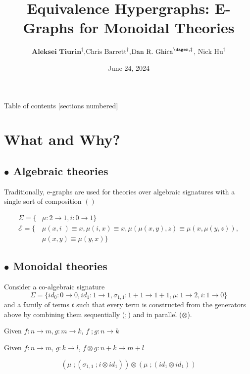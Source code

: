 \documentclass[aspectratio=169]{beamer}
\title{Equivalence Hypergraphs: E-Graphs for Monoidal Theories}
\date{June 24, 2024} %
\author[Aleksei Tiurin]{$\textbf{Aleksei Tiurin}^{\dagger}$,$\text{Chris Barrett}^{\dagger}$,$\text{Dan R. Ghica}^{\dager,\ddagger}$, $\text{Nick Hu}^{\dagger}$}
\institute{$^{\dagger}$University of Birmingham, $^{\dagger}$ Huawei Central Software Institute}
\newcommand{\bsubsection}[1]{\subsection{$\bullet$ #1}}
\begin{document}
 

\maketitle 

\begin{frame}{Table of contents}
    \small
    [sections numbered]
    \tableofcontents
\end{frame}

\section{What and Why?}
\bsubsection{Algebraic theories}

\begin{frame}
    Traditionally, e-graphs are used for \alert{theories} over \alert{algebraic} signatures with a single sort of composition $()$
    \pause
    \vfill
    \begin{example}
    
    \begin{align*}
    \Sigma = \{&\mu : 2 \to 1, i : 0 \to 1\}\\
    \mathcal{E} = \{&\mu(x,i\;) \equiv x, \mu(i,x) \equiv x,
     \mu(\mu(x,y),z) \equiv \mu(x,\mu(y,z)),\\
    &\mu(x,y) \equiv \mu(y,x)\}    
    \end{align*}
    \end{example}

\end{frame}

\bsubsection{Monoidal theories}

\begin{frame}{}
    
Consider a \alert{co-algebraic} signature 
\[
\Sigma = \{id_0 : 0 \to 0, id_{1} : 1 \to 1, \sigma_{1,1} : 1 + 1 \to 1 + 1,\mu : 1 \to 2, i : 1 \to 0\}
\]
and a family of terms $t$ such that every term is constructed from the generators above by combining them sequentially ($;$) and in parallel ($\otimes$).

Given $f : n \to m, g : m \to k$, $f\;;g : n \to k$

Given $f : n \to m$, $g : k \to l$, $f \otimes g : n + k \to m + l$

\pause
\begin{example}
    \[
    (\mu\;;(\sigma_{1,1}\;;i \otimes id_{1})) \otimes (\mu\;;(id_{1}\otimes id_{1}))
    \]
\end{example}

\end{frame}
\end{document}
